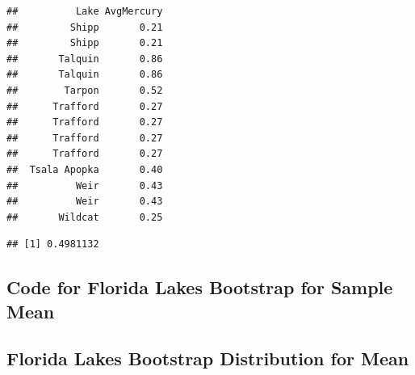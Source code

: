 \documentclass[]{book}
\newenvironment{Shaded}{\begin{snugshade}}{\end{snugshade}}
\newcommand{\KeywordTok}[1]{\textcolor[rgb]{0.13,0.29,0.53}{\textbf{#1}}}
\newcommand{\DataTypeTok}[1]{\textcolor[rgb]{0.13,0.29,0.53}{#1}}
\newcommand{\DecValTok}[1]{\textcolor[rgb]{0.00,0.00,0.81}{#1}}
\newcommand{\StringTok}[1]{\textcolor[rgb]{0.31,0.60,0.02}{#1}}
\newcommand{\OtherTok}[1]{\textcolor[rgb]{0.56,0.35,0.01}{#1}}
\newcommand{\ControlFlowTok}[1]{\textcolor[rgb]{0.13,0.29,0.53}{\textbf{#1}}}
\newcommand{\OperatorTok}[1]{\textcolor[rgb]{0.81,0.36,0.00}{\textbf{#1}}}
\newcommand{\NormalTok}[1]{#1}
\begin{document}
\begin{verbatim}
##          Lake AvgMercury
##         Shipp       0.21
##         Shipp       0.21
##       Talquin       0.86
##       Talquin       0.86
##        Tarpon       0.52
##      Trafford       0.27
##      Trafford       0.27
##      Trafford       0.27
##      Trafford       0.27
##  Tsala Apopka       0.40
##          Weir       0.43
##          Weir       0.43
##       Wildcat       0.25
\end{verbatim}

\begin{Shaded}
\end{Shaded}

\begin{verbatim}
## [1] 0.4981132
\end{verbatim}

\subsection{Code for Florida Lakes Bootstrap for Sample
Mean}\label{code-for-florida-lakes-bootstrap-for-sample-mean}

\begin{Shaded}
\end{Shaded}

\subsection{Florida Lakes Bootstrap Distribution for
Mean}\label{florida-lakes-bootstrap-distribution-for-mean}
\end{document}
